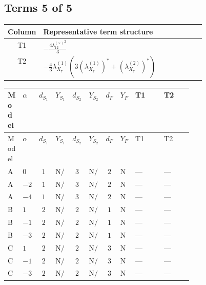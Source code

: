 \documentclass[8pt]{article}
\begin{document}
\begin{landscape}
\subsection*{Terms 5 of 5}
\begin{center}
\begin{tabular}{@{}c >{\raggedright\arraybackslash}p{0.82\linewidth}@{}}
\toprule
Column & Representative term structure \\
\midrule
T1 & \(\displaystyle -\frac{4 {\lambda_{12}^{(\times)}}^2}{3}\) \\
\midrule
T2 & \(\displaystyle -\frac{4}{3} {\lambda_{X_{7}}^{(1)}} (3 \left({\lambda_{X_{7}}^{(1)}}\right)^{*}+\left({\lambda_{X_{7}}^{(2)}}\right)^{*})\) \\
\midrule
\bottomrule
\end{tabular}
\end{center}
\smallskip
\tiny
\begin{longtable}{@{}llcccccc >{\raggedright\arraybackslash}p{0.21\linewidth} >{\raggedright\arraybackslash}p{0.21\linewidth}@{}}
\toprule
Model & $\alpha$ & $d_{S_1}$ & $Y_{S_1}$ & $d_{S_2}$ & $Y_{S_2}$ & $d_F$ & $Y_F$ & T1 & T2 \\
\midrule
\endfirsthead
\toprule
Model & $\alpha$ & $d_{S_1}$ & $Y_{S_1}$ & $d_{S_2}$ & $Y_{S_2}$ & $d_F$ & $Y_F$ & T1 & T2 \\
\midrule
\endhead
A & $0$ & $1$ & $\text{N/A}$ & $3$ & $\text{N/A}$ & $2$ & $\text{N/A}$ & --- & --- \\
\midrule
A & $-2$ & $1$ & $\text{N/A}$ & $3$ & $\text{N/A}$ & $2$ & $\text{N/A}$ & --- & --- \\
\midrule
A & $-4$ & $1$ & $\text{N/A}$ & $3$ & $\text{N/A}$ & $2$ & $\text{N/A}$ & --- & --- \\
\midrule
B & $1$ & $2$ & $\text{N/A}$ & $2$ & $\text{N/A}$ & $1$ & $\text{N/A}$ & --- & --- \\
\midrule
B & $-1$ & $2$ & $\text{N/A}$ & $2$ & $\text{N/A}$ & $1$ & $\text{N/A}$ & --- & --- \\
\midrule
B & $-3$ & $2$ & $\text{N/A}$ & $2$ & $\text{N/A}$ & $1$ & $\text{N/A}$ & --- & --- \\
\midrule
C & $1$ & $2$ & $\text{N/A}$ & $2$ & $\text{N/A}$ & $3$ & $\text{N/A}$ & --- & --- \\
\midrule
C & $-1$ & $2$ & $\text{N/A}$ & $2$ & $\text{N/A}$ & $3$ & $\text{N/A}$ & --- & --- \\
\midrule
C & $-3$ & $2$ & $\text{N/A}$ & $2$ & $\text{N/A}$ & $3$ & $\text{N/A}$ & --- & --- \\

\end{longtable}
\end{landscape}
\end{document}
